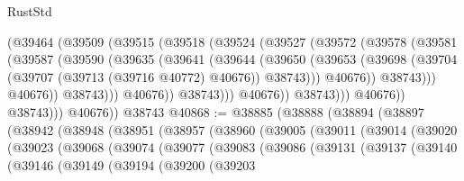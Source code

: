\begin{lexlean}{RustStd}
\begin{coremodule}
                            (@39464
                              (@39509
                                (@39515
                                  (@39518
                                    (@39524
                                      (@39527
                                        (@39572
                                          (@39578
                                            (@39581
                                              (@39587
                                                (@39590
                                                  (@39635
                                                    (@39641
                                                      (@39644
                                                        (@39650
                                                          (@39653
                                                            (@39698
                                                              (@39704
                                                                (@39707
                                                                  (@39713 (@39716 @40772) @40676))
                                                                @38743)))
                                                          @40676))
                                                      @38743)))
                                                @40676))
                                            @38743)))
                                      @40676))
                                  @38743)))
                            @40676))
                        @38743)))
                  @40676))
              @38743)))
        @40676))
    @38743
@40868 := @38885
    (@38888
      (@38894
        (@38897
          (@38942
            (@38948
              (@38951
                (@38957
                  (@38960
                    (@39005
                      (@39011
                        (@39014
                          (@39020
                            (@39023
                              (@39068
                                (@39074
                                  (@39077
                                    (@39083
                                      (@39086
                                        (@39131
                                          (@39137
                                            (@39140
                                              (@39146
                                                (@39149
                                                  (@39194
                                                    (@39200
                                                      (@39203

\end{coremodule}
\end{lexlean}

